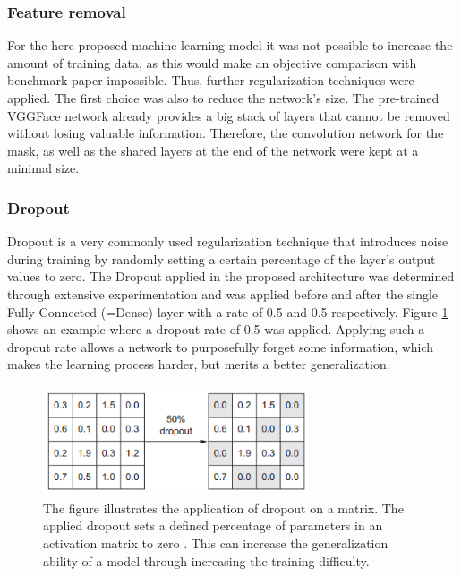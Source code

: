 \subsubsection{Feature removal}
For the here proposed machine learning model it was not possible to increase the amount of training data, as this would make an objective comparison with benchmark paper impossible. Thus, further regularization techniques were applied. The first choice was also to reduce the network's size. The pre-trained VGGFace network already provides a big stack of layers that cannot be removed without losing valuable information. Therefore, the convolution network for the mask, as well as the shared layers at the end of the network were kept at a minimal size.

\subsubsection{Dropout}
Dropout is a very commonly used regularization technique that introduces noise during training by randomly setting a certain percentage of the layer's output values to zero. The Dropout applied in the proposed architecture was determined through extensive experimentation and was applied before and after the single Fully-Connected (=Dense) layer with a rate of 0.5 and 0.5 respectively. Figure \ref{fig:Dropout} shows an example where a dropout rate of 0.5 was applied. Applying such a dropout rate allows a network to purposefully forget some information, which makes the learning process harder, but merits a better generalization.

\begin{figure}[H]
  \begin{center}
  \includegraphics[angle=0, width=0.7\textwidth]{Figures/dropout.PNG}
  \caption[Dropout regularization]{The figure illustrates the application of dropout on a matrix. The applied dropout sets a defined percentage of parameters in an activation matrix to zero \citep{Chollet:2017:DeepLearningPython}. This can increase the generalization ability of a model through increasing the training difficulty.}
  \label{fig:Dropout}
  \end{center}
\end{figure}




